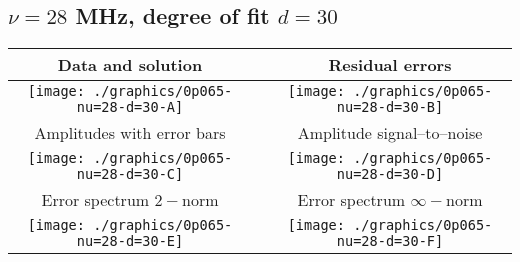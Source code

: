 

% 

\clearpage{}
\break{}

\subsection{$\nu = 28$ MHz, degree of fit $d = 30$}

\begin{table}[h]
    \begin{center}
        \begin{tabular}{ccc}
            Data and solution & \quad & Residual errors \\\hline
            \texttt{[image: ./graphics/0p065-nu=28-d=30-A]} &&
            \texttt{[image: ./graphics/0p065-nu=28-d=30-B]} \\[15pt]
            Amplitudes with error bars && Amplitude signal--to--noise \\\hline
            \texttt{[image: ./graphics/0p065-nu=28-d=30-C]} &&
            \texttt{[image: ./graphics/0p065-nu=28-d=30-D]} \\[15pt]
            Error spectrum $2-$norm && Error spectrum $\infty-$norm \\\hline
            \texttt{[image: ./graphics/0p065-nu=28-d=30-E]} &&
            \texttt{[image: ./graphics/0p065-nu=28-d=30-F]} \\[15pt]
        \end{tabular}
    \end{center}
\label{fig:elev=65, nu=28}
\end{table}



\endinput
